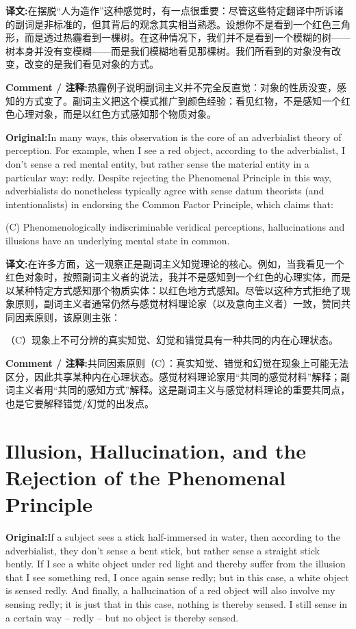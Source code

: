 \documentclass[11pt,a4paper]{article}
\newcommand{\eng}[1]{\begin{engbox}\noindent\textbf{Original:}\quad #1\end{engbox}}
\newcommand{\cn}[1]{\begin{cnbox}\noindent\textbf{译文:}\quad #1\end{cnbox}}
\newcommand{\cmt}[1]{\begin{commentbox}\noindent\textbf{Comment / 注释:}\quad #1\end{commentbox}}
\begin{document}
\cn{在摆脱“人为造作”这种感觉时，有一点很重要：尽管这些特定翻译中所诉诸的副词是非标准的，但其背后的观念其实相当熟悉。设想你不是看到一个红色三角形，而是透过热霾看到一棵树。在这种情况下，我们并不是看到一个模糊的树——树本身并没有变模糊——而是我们模糊地看见那棵树。我们所看到的对象没有改变，改变的是我们看见对象的方式。}

\cmt{热霾例子说明副词主义并不完全反直觉：对象的性质没变，感知的方式变了。副词主义把这个模式推广到颜色经验：看见红物，不是感知一个红色心理对象，而是以红色方式感知那个物质对象。}

\eng{In many ways, this observation is the core of an adverbialist theory of perception. For example, when I see a red object, according to the adverbialist, I don’t sense a red mental entity, but rather sense the material entity in a particular way: redly. Despite rejecting the Phenomenal Principle in this way, adverbialists do nonetheless typically agree with sense datum theorists (and intentionalists) in endorsing the Common Factor Principle, which claims that:

(C) Phenomenologically indiscriminable veridical perceptions, hallucinations and illusions have an underlying mental state in common.}

\cn{在许多方面，这一观察正是副词主义知觉理论的核心。例如，当我看见一个红色对象时，按照副词主义者的说法，我并不是感知到一个红色的心理实体，而是以某种特定方式感知那个物质实体：以红色地方式感知。尽管以这种方式拒绝了现象原则，副词主义者通常仍然与感觉材料理论家（以及意向主义者）一致，赞同共同因素原则，该原则主张：

（C）现象上不可分辨的真实知觉、幻觉和错觉具有一种共同的内在心理状态。}

\cmt{共同因素原则（C）：真实知觉、错觉和幻觉在现象上可能无法区分，因此共享某种内在心理状态。感觉材料理论家用“共同的感觉材料”解释；副词主义者用“共同的感知方式”解释。这是副词主义与感觉材料理论的重要共同点，也是它要解释错觉/幻觉的出发点。}

\section{Illusion, Hallucination, and the Rejection of the Phenomenal Principle}

\eng{If a subject sees a stick half-immersed in water, then according to the adverbialist, they don’t sense a bent stick, but rather sense a straight stick bently. If I see a white object under red light and thereby suffer from the illusion that I see something red, I once again sense redly; but in this case, a white object is sensed redly. And finally, a hallucination of a red object will also involve my sensing redly; it is just that in this case, nothing is thereby sensed. I still sense in a certain way – redly – but no object is thereby sensed.}
\end{document}
